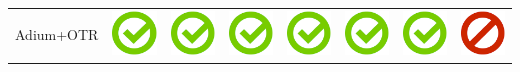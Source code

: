 \documentclass[10pt,foldmark,tumble]{leaflet}
\begin{document}
{{\begin{tabular}{ L{2cm} | C{2cm} | C{2cm} | C{2cm} | C{2cm} | C{2cm} | C{2cm} | C{2cm} | }
Adium+OTR & \includegraphics[scale=0.1]{pics/haken.png} & \includegraphics[scale=0.1]{pics/haken.png} & \includegraphics[scale=0.1]{pics/haken.png} & \includegraphics[scale=0.1]{pics/haken.png} & \includegraphics[scale=0.1]{pics/haken.png} & \includegraphics[scale=0.1]{pics/haken.png} & \includegraphics[scale=0.1]{pics/nohaken.png} \tabularnewline

\end{tabular}}}
\end{document}
